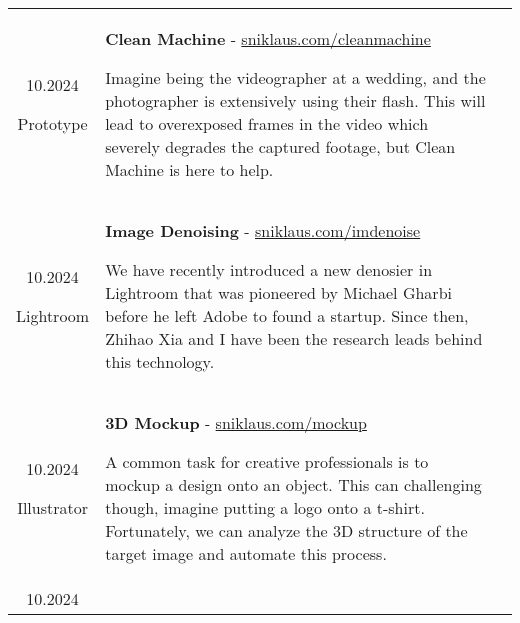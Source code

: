 \documentclass[10pt]{article}
\begin{document}
\begin{tabular}{C Z >{\setlength{\baselineskip}{0.9\baselineskip}}D}
	{
		10.2024
		
		\vspace{-0.05cm}
		
		{\scriptsize Prototype}
	}
	&
	{
		{\bf Clean Machine} - \href{https://sniklaus.com/cleanmachine}{sniklaus.com/cleanmachine}
		
		\vspace{0.00cm}
		
		{\scriptsize Imagine being the videographer at a wedding, and the photographer is extensively using their flash. This will lead to overexposed frames in the video which severely degrades the captured footage, but Clean Machine is here to help.}
		
		\vspace{0.0cm}
	}
	\\
	{
		10.2024
		
		\vspace{-0.05cm}
		
		{\scriptsize Lightroom}
	}
	&
	{
		{\bf Image Denoising} - \href{https://sniklaus.com/imdenoise}{sniklaus.com/imdenoise}
		
		\vspace{0.00cm}
		
		{\scriptsize We have recently introduced a new denosier in Lightroom that was pioneered by Michael Gharbi before he left Adobe to found a startup. Since then, Zhihao Xia and I have been the research leads behind this technology.}
		
		\vspace{0.0cm}
	}
	\\
	{
		10.2024
		
		\vspace{-0.05cm}
		
		{\scriptsize Illustrator}
	}
	&
	{
		{\bf 3D Mockup} - \href{https://sniklaus.com/mockup}{sniklaus.com/mockup}
		
		\vspace{0.00cm}
		
		{\scriptsize A common task for creative professionals is to mockup a design onto an object. This can challenging though, imagine putting a logo onto a t-shirt. Fortunately, we can analyze the 3D structure of the target image and automate this process.}
		
		\vspace{0.0cm}
	}
	\\
	{
		10.2024
		
}
\end{tabular}
\end{document}
